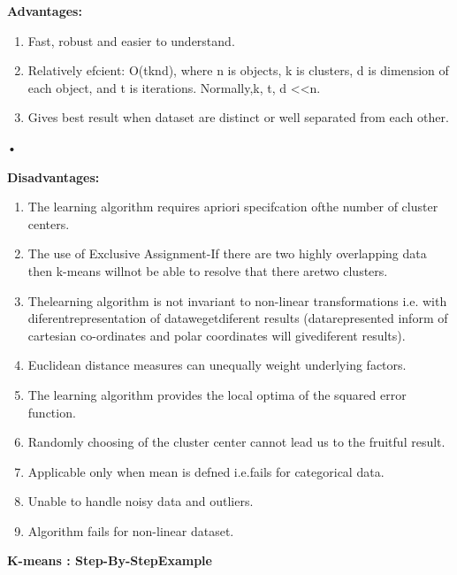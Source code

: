 \documentclass[11pt]{article}
\begin{document}
	\noindent \textbf{Advantages:} \\
	\begin{enumerate}
		\item Fast, robust and easier to understand.
		\item Relatively efcient: O(tknd), where n is objects, k is  clusters, d is  dimension of each
		object, and t is  iterations. Normally,k, t, d <<n.
		\item Gives best result when dataset are distinct or well separated from each other.
	\end{enumerate}•
	
	
	\noindent \textbf{Disadvantages:} \\
	\begin{enumerate}
		\item The learning algorithm requires apriori specifcation ofthe number of cluster centers.
		\item The use of Exclusive Assignment-If there are two highly overlapping data then k-means
		willnot be
		able to resolve that there aretwo clusters.
		\item Thelearning algorithm is not invariant to non-linear transformations i.e. with
		diferentrepresentation
		of datawegetdiferent results (datarepresented inform of cartesian co-ordinates and polar coordinates
		will givediferent results).
		\item Euclidean distance measures can unequally weight underlying factors.
		\item The learning algorithm provides the local optima of the squared error function.
		\item Randomly choosing of the cluster center cannot lead us to the fruitful result.
		\item Applicable only when mean is defned i.e.fails for categorical data.
		\item Unable to handle noisy data and outliers.
		\item Algorithm fails for non-linear dataset. \\
	\end{enumerate}
	
	
	\noindent \textbf{ K-means : Step-By-StepExample}
\end{document}
